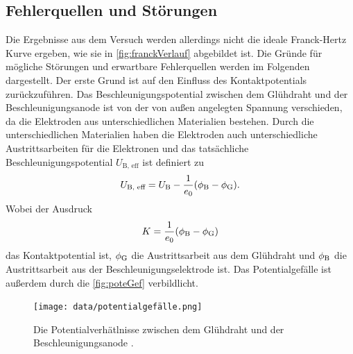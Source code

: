 \subsection{Fehlerquellen und Störungen}
\label{subsec:fehlerStoerung}

Die Ergebnisse aus dem Versuch werden allerdings nicht die ideale Franck-Hertz Kurve ergeben, wie sie in \autoref{fig:franckVerlauf} abgebildet ist. Die Gründe für mögliche Störungen und erwartbare Fehlerquellen werden im Folgenden dargestellt. \newline
Der erste Grund ist auf den Einfluss des Kontaktpotentials zurückzuführen. Das Beschleunigungspotential zwischen dem Glühdraht und der Beschleunigungsanode ist von der von außen angelegten Spannung verschieden, da die Elektroden aus unterschiedlichen Materialien bestehen.
Durch die unterschiedlichen Materialien haben die Elektroden auch unterschiedliche Austrittsarbeiten für die Elektronen und das tatsächliche Beschleunigungspotential $U_{\text {B, eff}}$ ist definiert zu
\begin{align}
    U_{\text {B, eff}} = U_{\text B} - \frac{1}{e_0} (\phi_{\text B} - \phi_{\text G}).
    \label{eqn:potentialGef}
\end{align}
Wobei der Ausdruck
\begin{align}
    K = \frac{1}{e_0} (\phi_{\text B} - \phi_{\text G})
\end{align}
das Kontaktpotential ist, $\phi_{\text G}$ die Austrittsarbeit aus dem Glühdraht und $\phi_{\text B}$ die Austrittsarbeit aus der Beschleunigungselektrode ist.
Das Potentialgefälle ist außerdem durch die \autoref{fig:poteGef} verbildlicht.

\begin{figure}[H]
    \centering
    \texttt{[image: data/potentialgefälle.png]}
    \caption{Die Potentialverhätlnisse zwischen dem Glühdraht und der Beschleunigungsanode \cite{Anleitung601}.}
    \label{fig:poteGef}
\end{figure}

